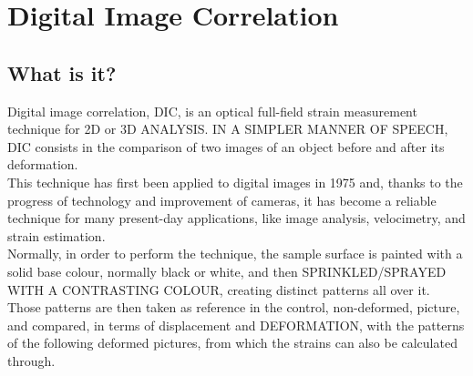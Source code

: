 

\chapter{Digital Image Correlation}
\label{cha:digital_image_correlation}

\section{What is it?}
\label{sub:dic_definition}






Digital image correlation, DIC, is an optical full-field strain measurement technique for 2D or 3D ANALYSIS. IN A SIMPLER MANNER OF SPEECH, DIC consists in the comparison of two images of an object before and after its deformation.\\
This technique has first been applied to digital images in 1975 and, thanks to the progress of technology and improvement of cameras, it has become a reliable technique for many present-day applications, like image analysis, velocimetry, and strain estimation.\\

Normally, in order to perform the technique, the sample surface is painted with a solid base colour, normally black or white, and then SPRINKLED/SPRAYED WITH A CONTRASTING COLOUR, creating distinct patterns all over it. Those patterns are then taken as reference in the control, non-deformed, picture, and compared, in terms of displacement and DEFORMATION, with the patterns of the following deformed pictures, from which the strains can also be calculated through.\\

